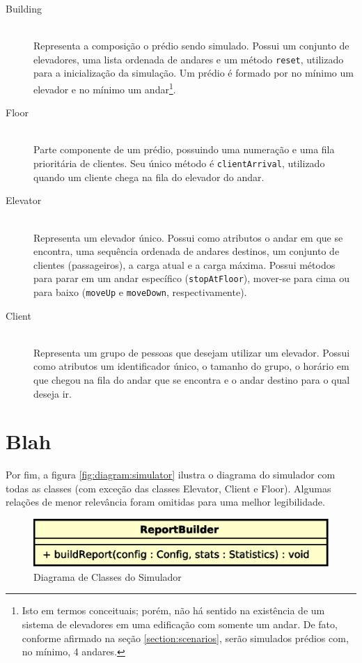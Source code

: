 \begin{description}
  \item[Building] \hfill \\
    Representa a composição o prédio sendo simulado. Possui um conjunto de
    elevadores, uma lista ordenada de andares e um método \texttt{reset},
    utilizado para a inicialização da simulação. Um prédio é formado por no
    mínimo um elevador e no mínimo um andar\footnote{Isto em termos conceituais;
    porém, não há sentido na existência de um sistema de elevadores em uma
    edificação com somente um andar. De fato, conforme afirmado na seção
    \ref{section:scenarios}, serão simulados prédios com, no mínimo, 4
    andares.}.

  \item[Floor] \hfill \\
    Parte componente de um prédio, possuindo uma numeração e uma fila
    prioritária de clientes. Seu único método é \texttt{clientArrival},
    utilizado quando um cliente chega na fila do elevador do andar.

\item[Elevator] \hfill \\
    Representa um elevador único. Possui como atributos o andar em que se
    encontra, uma sequência ordenada de andares destinos, um conjunto de
    clientes (passageiros), a carga atual e a carga máxima. Possui métodos para
    parar em um andar específico (\texttt{stopAtFloor}), mover-se para cima ou
    para baixo (\texttt{moveUp} e \texttt{moveDown}, respectivamente).

\item[Client] \hfill \\
    Representa um grupo de pessoas que desejam utilizar um elevador. Possui como atributos um identificador único, o tamanho do grupo, o horário em que chegou na fila do andar que se encontra e o andar destino para o qual deseja ir.

\end{description}

\section{Blah}

Por fim, a figura \ref{fig:diagram:simulator} ilustra o diagrama do simulador
com todas as classes (com exceção das classes Elevator, Client e Floor). Algumas
relações de menor relevância foram omitidas para uma melhor legibilidade.

\begin{figure}[htb!]
  \centering
  \includegraphics[scale=0.6]{img/Report.eps}
  \caption{Diagrama de Classes do Simulador}
\label{fig:diagram:report}
\end{figure}


